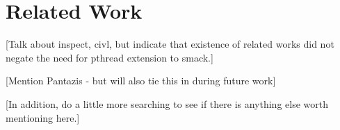 \chapter{Related Work}\label{thesis_relatedwork}
[Talk about inspect, civl, but indicate that existence of related works
did not negate the need for pthread extension to smack.]

[Mention Pantazis - but will also tie this in during future work]

[In addition, do a little more searching to see if there is anything
else worth mentioning here.]


